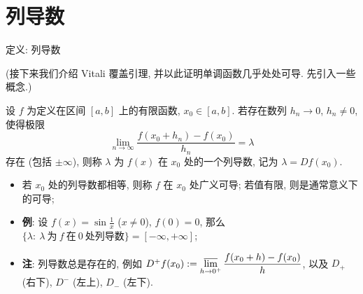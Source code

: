 
\section[列导数]{列导数}


\begin{frame}{定义: 列导数}

(接下来我们介绍 Vitali 覆盖引理, 并以此证明单调函数几乎处处可导. 先引入一些概念.)

\begin{Def}[列导数]
设 $f$ 为定义在区间 $[a, b]$ 上的有限函数, $x_0 \in [a, b]$. 若存在数列
$h_n \to 0$, $h_n \neq 0$, 使得极限
\[
\lim_{n \to \infty} \frac{f(x_0 + h_n) - f(x_0)}{h_n} = \lambda
\]
存在 (包括 $\pm \infty$), 则称 $\lambda$ 为 $f(x)$ 在 $x_0$ 处的一个\alert{列导数},
记为 $\lambda = D f(x_0)$.
\end{Def}

\pause

\begin{itemize}
\item 若 $x_0$ 处的列导数都相等, 则称 $f$ 在 $x_0$ 处\alert{广义可导};
  若值有限, 则是通常意义下的可导;
\item \textbf{例}: 设 $f(x) = \sin \frac1x$ ($x \neq 0$), $f(0) = 0$,
  那么 $\{ \lambda:\ \lambda\ \text{为}\ f\ \text{在}\ 0\ \text{处列导数} \} = [-\infty, +\infty]$;
\item \textbf{注}: 列导数总是存在的, 例如
  $D^+ f(x_0) := \varlimsup\limits_{h \to 0^+} \dfrac{f(x_0+h) - f(x_0)}{h}$,
  以及 $D_+$ (右下), $D^-$ (左上), $D_-$ (左下).
\end{itemize}

\end{frame}


